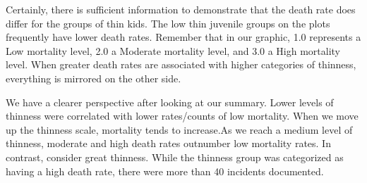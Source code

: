 \documentclass[
]{article}
\begin{document}
Certainly, there is sufficient information to demonstrate that the death
rate does differ for the groups of thin kids. The low thin juvenile
groups on the plots frequently have lower death rates. Remember that in
our graphic, 1.0 represents a Low mortality level, 2.0 a Moderate
mortality level, and 3.0 a High mortality level. When greater death
rates are associated with higher categories of thinness, everything is
mirrored on the other side.

We have a clearer perspective after looking at our summary. Lower levels
of thinness were correlated with lower rates/counts of low mortality.
When we move up the thinness scale, mortality tends to increase.As we
reach a medium level of thinness, moderate and high death rates
outnumber low mortality rates. In contrast, consider great thinness.
While the thinness group was categorized as having a high death rate,
there were more than 40 incidents documented.
\end{document}
